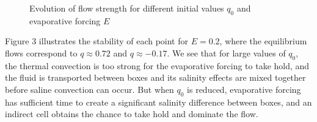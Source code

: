 \documentclass[letterpaper, 11pt]{article}
\begin{document}
\begin{figure}[h]
\begin{center}
\caption{Evolution of flow strength for different initial values $q_0$ and evaporative forcing $E$}
\end{center}
\end{figure}

Figure 3 illustrates the stability of each point for $E = 0.2$, where the equilibrium flows correspond to $q \approx 0.72$ and $q \approx -0.17$. We see that for large values of $q_0$, the thermal convection is too strong for the evaporative forcing to take hold, and the fluid is transported between boxes and its salinity effects are mixed together before saline convection can occur. But when $q_0$ is reduced, evaporative forcing has sufficient time to create a significant salinity difference between boxes, and an indirect cell obtains the chance to take hold and dominate the flow.
\end{document}
